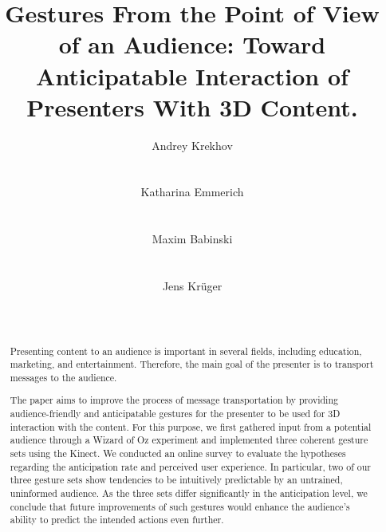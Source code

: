 \documentclass{sigchi}
\begin{document}
\title{Gestures From the Point of View of an Audience: Toward Anticipatable Interaction of Presenters With 3D Content.}

\author{
  \alignauthor Andrey Krekhov\\
    \\
    \\
  \alignauthor Katharina Emmerich\\
    \\
    \\
  \alignauthor Maxim Babinski\\
    \\
    \\
  \alignauthor Jens Kr\"uger\\
    \\
    \\
}


\maketitle

\begin{abstract}


Presenting content to an audience is important in several fields, including education, marketing, and entertainment. Therefore, the main goal of the presenter is to transport messages to the audience. 

The paper aims to improve the process of message transportation by providing audience-friendly and anticipatable gestures for the presenter to be used for 3D interaction with the content. For this purpose, we first gathered input from a potential audience through a Wizard of Oz experiment and implemented three coherent gesture sets using the Kinect. We conducted an online survey to evaluate the hypotheses regarding the anticipation rate and perceived user experience. In particular, two of our three gesture sets show tendencies to be intuitively predictable by an untrained, uninformed audience. As the three sets differ significantly in the anticipation level, we conclude that future improvements of such gestures would enhance the audience's ability to predict the intended actions even further.

\end{abstract}
\end{document}
